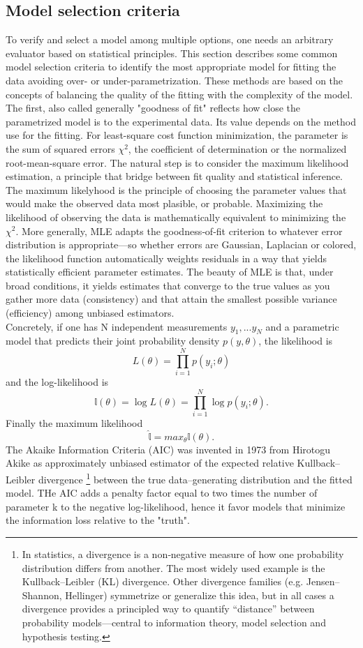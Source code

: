 \subsection{Model selection criteria}
To verify and select a model among multiple options, one needs an arbitrary evaluator based on statistical principles. This section describes some common model selection criteria to identify the most appropriate model for fitting the data avoiding over- or under-parametrization. These methods are based on the concepts of balancing the quality of the fitting with the complexity of the model. The first, also called generally "goodness of fit" reflects how close the parametrized model is to the experimental  data. Its value depends on the method use for the fitting. For least-square cost function minimization, the parameter is the sum of squared errors $\chi ^2$, the coefficient of determination or the normalized root-mean-square error. The natural step is to consider the maximum likelihood estimation, a principle that bridge between fit quality and statistical inference. The maximum likelyhood is the principle of choosing the parameter values that would make the observed data most plasible, or probable. Maximizing the likelihood of observing the data is mathematically equivalent to minimizing the $\chi ^2$. More generally, MLE adapts the goodness‐of‐fit criterion to whatever error distribution is appropriate—so whether errors are Gaussian, Laplacian or colored, the likelihood function automatically weights residuals in a way that yields statistically efficient parameter estimates. The beauty of MLE is that, under broad conditions, it yields estimates that converge to the true values as you gather more data (consistency) and that attain the smallest possible variance (efficiency) among unbiased estimators. \\
Concretely, if one has N independent measurements {$y_1,...y_N$} and a parametric model that predicts their joint probability density $p(y,\theta)$, the likelihood is
$$
L(\theta)=\prod _{i=1} ^N p(y_i;\theta)
$$
and the log-likelihood is 
$$
\mathbb{l}(\theta)= \log L(\theta) =\prod _{i=1} ^N \log p(y_i;\theta).
$$
Finally the maximum likelihood
$$
\hat{\mathbb{l}} = max_{\theta} \mathbb{l}(\theta).
$$
The Akaike Information Criteria (AIC) was invented in 1973 from Hirotogu Akike as approximately unbiased estimator of the expected relative Kullback–Leibler divergence \footnote{In statistics, a divergence is a non‐negative measure of how one probability distribution differs from another. The most widely used example is the Kullback–Leibler (KL) divergence. Other divergence families (e.g. Jensen–Shannon, Hellinger) symmetrize or generalize this idea, but in all cases a divergence provides a principled way to quantify “distance” between probability models—central to information theory, model selection and hypothesis testing.} between the true data–generating distribution and the fitted model. THe AIC adds a penalty factor equal to two times the number of parameter k to the negative log-likelihood, hence it favor models that minimize the information loss relative to the "truth".
